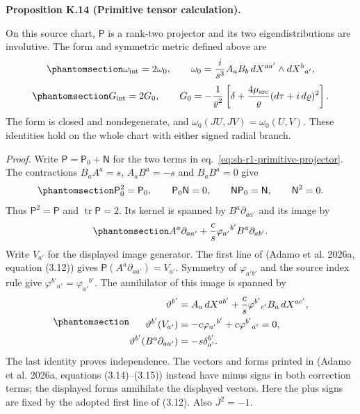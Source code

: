 \documentclass[
  english,
  11pt,
  reqno]{amsart}
\makeatletter
\newcommand{\pandocstatementheading}[1]{%
  \par\addpenalty{\@beginparpenalty}%
  \addvspace{.5\baselineskip plus .2\baselineskip minus .2\baselineskip}%
  {\normalfont\bfseries #1\par}%
  \nobreak\@afterindenttrue\@afterheading
}
\makeatother
\begin{document}
\pandocstatementheading{\protect{}\label{prop:sh-r1-primitive-tensor}Proposition K.14 (Primitive tensor calculation).}

On this source chart, \(\mathsf P\) is a rank-two projector and its two
eigendistributions are involutive. The form and symmetric metric defined
above are
\begin{equation}\protect\phantomsection\label{eq:sh-r1-contour-value}{
 \omega_{\rm int}=2\omega_0,\qquad
 \omega_0=\frac{i}{s^3}A_aB_b\,dX^{aa'}\wedge dX^b{}_{a'},
}\end{equation}
\begin{equation}\protect\phantomsection\label{eq:sh-r1-general-source-metric}{
 G_{\rm int}=2G_0,\qquad
 G_0=-\frac1{\varrho^2}
 \left[\delta+\frac{4\mu_{\rm src}}{\varrho}
                  (d\tau+i\,d\varrho)^2\right].
}\end{equation} The form is closed and nondegenerate, and
\(\omega_0(JU,JV)=\omega_0(U,V)\). These identities hold on the whole
chart with either signed radial branch.

\emph{Proof.} Write \(\mathsf P=\mathsf P_0+\mathsf N\) for the two
terms in eq.~\ref{eq:sh-r1-primitive-projector}. The contractions
\(B_aA^a=s\), \(A_aB^a=-s\) and \(B_aB^a=0\) give
\begin{equation}\protect\phantomsection\label{eq:sh-r1-projector-identities}{
 \mathsf P_0^2=\mathsf P_0,\qquad
 \mathsf P_0\mathsf N=0,\qquad
 \mathsf N\mathsf P_0=\mathsf N,\qquad \mathsf N^2=0.
}\end{equation} Thus \(\mathsf P^2=\mathsf P\) and
\(\operatorname{tr}\mathsf P=2\). Its kernel is spanned by
\(B^a\partial_{aa'}\) and its image by
\begin{equation}\protect\phantomsection\label{eq:sh-r1-projector-image}{
 A^a\partial_{aa'}+\frac c s\varphi_{a'}{}^{b'}B^a\partial_{ab'}.
}\end{equation} Write \(V_{a'}\) for the displayed image generator. The
first line of (Adamo et al. 2026a, equation (3.12)) gives
\(\mathsf P(A^a\partial_{aa'})=V_{a'}\). Symmetry of \(\varphi_{a'b'}\)
and the source index rule give
\(\varphi^{b'}{}_{a'}=\varphi_{a'}{}^{b'}\). The annihilator of this
image is spanned by
\begin{equation}\protect\phantomsection\label{eq:sh-r29-projector-annihilator}{
 \begin{aligned}
 \vartheta^{b'}&=A_a\,dX^{ab'}
       +\frac cs\varphi^{b'}{}_{c'}B_a\,dX^{ac'},\\
 \vartheta^{b'}(V_{a'})
       &=-c\varphi_{a'}{}^{b'}+c\varphi^{b'}{}_{a'}=0,\\
 \vartheta^{b'}(B^a\partial_{aa'})&=-s\delta_{a'}^{b'}.
 \end{aligned}
}\end{equation} The last identity proves independence. The vectors and
forms printed in (Adamo et al. 2026a, equations (3.14)--(3.15)) instead
have minus signs in both correction terms; the displayed forms
annihilate the displayed vectors. Here the plus signs are fixed by the
adopted first line of (3.12). Also \(J^2=-1\).
\end{document}
